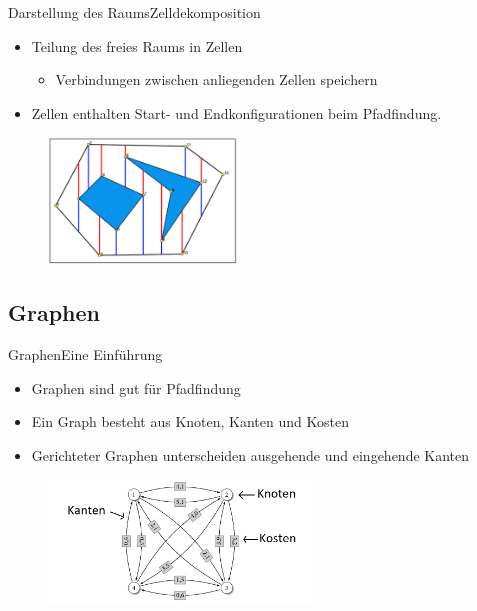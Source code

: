 \documentclass[t,aspectratio=169,dvipsnames]{beamer}
\begin{document}
\begin{frame}{Darstellung des Raums}{Zelldekomposition}
	\begin{itemize}
		\item Teilung des freies Raums in Zellen
		\begin{itemize}
			\item Verbindungen zwischen anliegenden Zellen speichern
		\end{itemize}
	    \item Zellen enthalten Start- und Endkonfigurationen beim Pfadfindung.
	\end{itemize}
	
	\begin{figure}
		\includegraphics[width=5.0cm]{images/Bild4.png}
	\end{figure}
\end{frame}
\subsection{Graphen}
\begin{frame}{Graphen}{Eine Einführung}
	\begin{itemize}
		\item Graphen sind gut für Pfadfindung
		\item Ein Graph besteht aus Knoten, Kanten und Kosten
		\item Gerichteter Graphen unterscheiden ausgehende und eingehende Kanten
	\end{itemize}
	
	\begin{figure}
		\includegraphics[width=7.0cm]{images/kk_graph_S6.png}
	\end{figure}
\end{frame}
\end{document}
